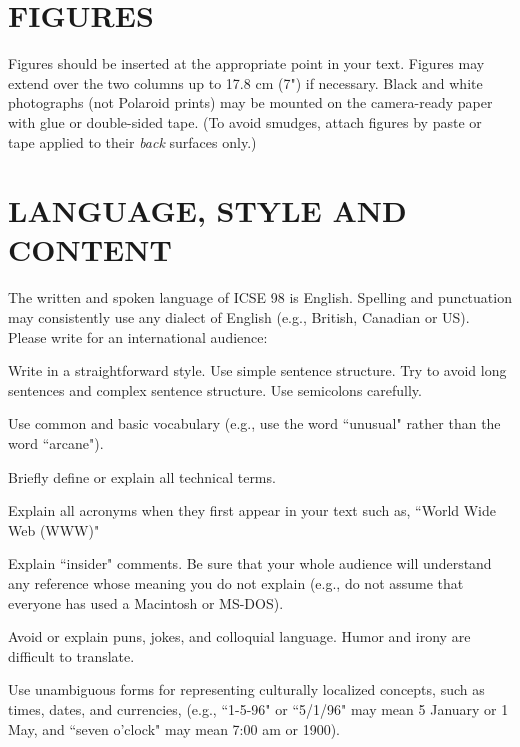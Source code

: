 \section{FIGURES}
Figures should be inserted at the appropriate point in your 
text. Figures may extend over the two columns up to 17.8 
cm (7") if necessary. Black and white photographs (not 
Polaroid prints) may be mounted on the camera-ready paper 
with glue or double-sided tape. (To avoid smudges, attach 
figures by paste or tape applied to their {\it back} surfaces only.)

\section{LANGUAGE, STYLE AND CONTENT}
The written and spoken language of ICSE 98 is English. 
Spelling and punctuation may consistently use any dialect 
of English (e.g., British, Canadian or US). Please write for 
an international audience:
 
\begin{smallitem}
\item Write in a straightforward style. Use simple sentence 
structure. Try to avoid long sentences and complex sentence 
structure. Use semicolons carefully.
 
\item Use common and basic vocabulary (e.g., use the word 
``unusual" rather than the word ``arcane").
 
\item Briefly define or explain all technical terms.
 
\item Explain all acronyms when they first appear in your text 
such as, ``World Wide Web (WWW)"
 
\item Explain ``insider" comments. Be sure that your whole 
audience will understand any reference whose meaning 
you do not explain (e.g., do not assume that everyone 
has used a Macintosh or MS-DOS).
 
\item Avoid or explain puns, jokes, and colloquial language. 
Humor and irony are difficult to translate. 
 
\item Use unambiguous forms for representing culturally 
localized concepts, such as times, dates, and currencies, 
(e.g., ``1-5-96" or ``5/1/96" may mean 5 January or 1 
May, and ``seven o'clock" may mean 7:00 am or 1900).
\end{smallitem}
 
